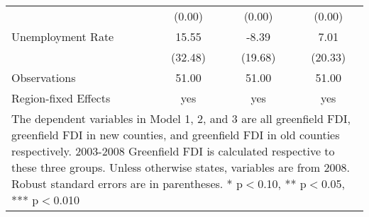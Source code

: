 \begin{table}[!htbp]
\begin{tabular}{l*{3}{c}}
                    &              (0.00)   &              (0.00)   &              (0.00)   \\
Unemployment Rate   &               15.55   &               -8.39   &                7.01   \\
                    &             (32.48)   &             (19.68)   &             (20.33)   \\
\hline
Observations        &               51.00   &               51.00   &               51.00   \\
Region-fixed Effects&                 yes   &                 yes   &                 yes   \\
\hline\hline
\multicolumn{4}{p{0.75\linewidth}}{\footnotesize The dependent variables in Model 1, 2, and 3 are all greenfield FDI, greenfield FDI in new counties, and greenfield FDI in old counties respectively. 2003-2008 Greenfield FDI is calculated respective to these three groups. Unless otherwise states, variables are from 2008. Robust standard errors are in parentheses. * p$<$0.10, ** p$<$0.05, *** p$<$0.010}\\
\end{tabular}
\end{table}
